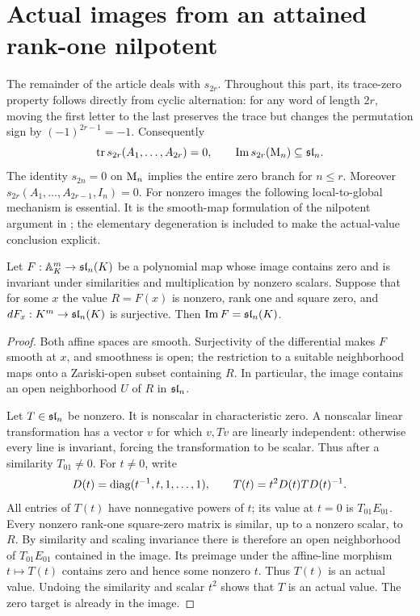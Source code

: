\section{Actual images from an attained rank-one nilpotent}\label{sec:even-prelim}
The remainder of the article deals with $s_{2r}$. Throughout this part,
its trace-zero property follows directly from cyclic alternation:
for any word of length $2r$, moving the first letter to the last
preserves the trace but changes the permutation sign by
$(-1)^{2r-1}=-1$. Consequently
\begin{equation}\label{eq:even-trace}
 \operatorname{tr} s_{2r}(A_1,\ldots,A_{2r})=0,
 \qquad \operatorname{Im} s_{2r}(\mathrm{M}_n)\subseteq\mathfrak{sl}_n.
\end{equation}
The identity $s_{2n}=0$ on $\mathrm{M}_n$ implies the entire zero branch
for $n\le r$. Moreover $s_{2r}(A_1,\ldots,A_{2r-1},I_n)=0$.
For nonzero images the following local-to-global mechanism is essential.
It is the smooth-map formulation of the nilpotent argument in
\cite[Lemma~2]{Tang2026FiveSix}; the elementary degeneration is
included to make the actual-value conclusion explicit.

\begin{lemma}
\label{lem:nilpotent-open}
Let $F:\mathbb A^m_K\to\mathfrak{sl}_n(K)$ be a polynomial map whose image
contains zero and is invariant under similarities and multiplication
by nonzero scalars. Suppose that for some $x$ the value $R=F(x)$
is nonzero, rank one and square zero, and
\(dF_x:K^m\to\mathfrak{sl}_n(K)\) is surjective. Then
$\operatorname{Im} F=\mathfrak{sl}_n(K)$.
\end{lemma}
\begin{proof}
Both affine spaces are smooth. Surjectivity of the differential
makes $F$ smooth at $x$, and smoothness is open; the restriction to
a suitable neighborhood maps onto a Zariski-open subset containing
$R$. In particular, the image contains an open neighborhood $U$ of
$R$ in $\mathfrak{sl}_n$.

Let $T\in\mathfrak{sl}_n$ be nonzero. It is nonscalar in characteristic zero.
A nonscalar linear transformation has a vector $v$ for which
$v,Tv$ are linearly independent: otherwise every line is invariant,
forcing the transformation to be scalar. Thus after a similarity
$T_{01}\ne0$. For $t\ne0$, write
\begin{equation}\label{eq:nilpotent-degeneration}
 D(t)=\operatorname{diag}(t^{-1},t,1,\ldots,1),\qquad
 T(t)=t^2D(t)TD(t)^{-1}.
\end{equation}
All entries of $T(t)$ have nonnegative powers of $t$; its value at
$t=0$ is $T_{01}E_{01}$. Every nonzero rank-one square-zero matrix
is similar, up to a nonzero scalar, to $R$. By similarity and
scaling invariance there is therefore an open neighborhood of
$T_{01}E_{01}$ contained in the image. Its preimage under the
affine-line morphism $t\mapsto T(t)$ contains zero and hence some
nonzero $t$. Thus $T(t)$ is an actual value. Undoing the
similarity and scalar $t^2$ shows that $T$ is an actual value.
The zero target is already in the image.
\end{proof}

